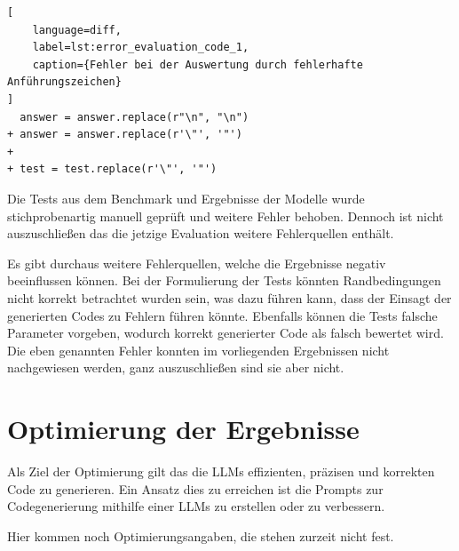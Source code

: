 \begin{lstlisting}[
	language=diff,
	label=lst:error_evaluation_code_1,
	caption={Fehler bei der Auswertung durch fehlerhafte Anführungszeichen}
]
  answer = answer.replace(r"\n", "\n")
+ answer = answer.replace(r'\"', '"')
+ 
+ test = test.replace(r'\"', '"') 
\end{lstlisting}

Die Tests aus dem Benchmark und Ergebnisse der Modelle wurde stichprobenartig manuell geprüft und weitere Fehler behoben. Dennoch ist nicht auszuschließen das die jetzige Evaluation weitere Fehlerquellen enthält.\vspace{0.2cm}

Es gibt durchaus weitere Fehlerquellen, welche die Ergebnisse negativ beeinflussen können. Bei der Formulierung der Tests könnten Randbedingungen nicht korrekt betrachtet wurden sein, was dazu führen kann, dass der Einsagt der generierten Codes zu Fehlern führen könnte. Ebenfalls können die Tests falsche Parameter vorgeben, wodurch korrekt generierter Code als falsch bewertet wird. Die eben genannten Fehler konnten im vorliegenden Ergebnissen nicht nachgewiesen werden, ganz auszuschließen sind sie aber nicht.



\section{Optimierung der Ergebnisse}
Als Ziel der Optimierung gilt das die LLMs effizienten, präzisen und korrekten Code zu generieren. Ein Ansatz dies zu erreichen ist die Prompts zur Codegenerierung mithilfe einer LLMs zu erstellen oder zu verbessern.

\begin{tcolorbox}[
	enhanced,
	colback=red!5!white,
	colframe=red!75!black!50,
	title= Mein roter Faden
	]
	Hier kommen noch Optimierungsangaben, die stehen zurzeit nicht fest.
\end{tcolorbox}
